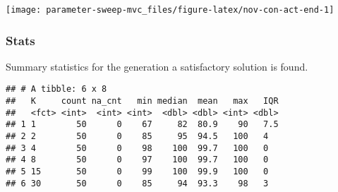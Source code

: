 \documentclass[]{book}
\newenvironment{Shaded}{\begin{snugshade}}{\end{snugshade}}
\newcommand{\DataTypeTok}[1]{\textcolor[rgb]{0.13,0.29,0.53}{#1}}
\newcommand{\DecValTok}[1]{\textcolor[rgb]{0.00,0.00,0.81}{#1}}
\newcommand{\KeywordTok}[1]{\textcolor[rgb]{0.13,0.29,0.53}{\textbf{#1}}}
\newcommand{\NormalTok}[1]{#1}
\newcommand{\OperatorTok}[1]{\textcolor[rgb]{0.81,0.36,0.00}{\textbf{#1}}}
\newcommand{\OtherTok}[1]{\textcolor[rgb]{0.56,0.35,0.01}{#1}}
\newcommand{\StringTok}[1]{\textcolor[rgb]{0.31,0.60,0.02}{#1}}
\begin{document}
\texttt{[image: parameter-sweep-mvc\_files/figure-latex/nov-con-act-end-1]}

\hypertarget{stats-54}{%
\subsubsection{Stats}\label{stats-54}}

Summary statistics for the generation a satisfactory solution is found.

\begin{Shaded}
\end{Shaded}

\begin{verbatim}
## # A tibble: 6 x 8
##   K     count na_cnt   min median  mean   max   IQR
##   <fct> <int>  <int> <int>  <dbl> <dbl> <int> <dbl>
## 1 1        50      0    67     82  80.9    90   7.5
## 2 2        50      0    85     95  94.5   100   4  
## 3 4        50      0    98    100  99.7   100   0  
## 4 8        50      0    97    100  99.7   100   0  
## 5 15       50      0    99    100  99.9   100   0  
## 6 30       50      0    85     94  93.3    98   3
\end{verbatim}
\end{document}
